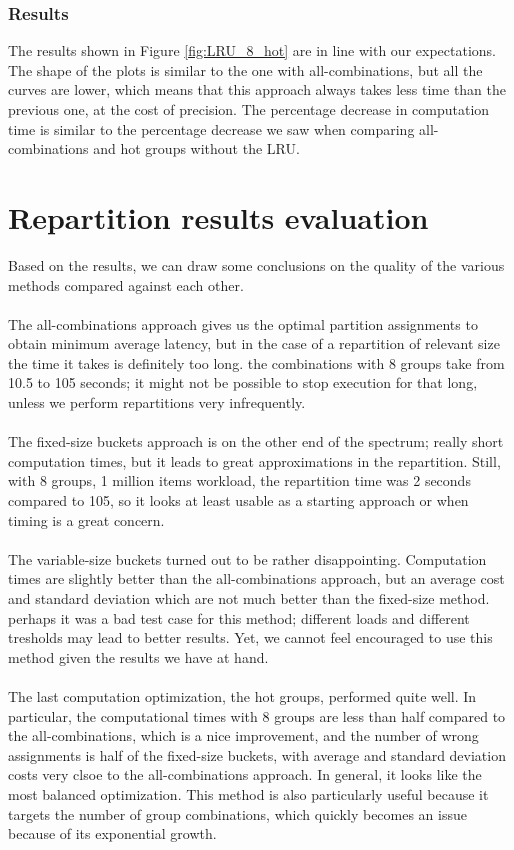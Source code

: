 \subsubsection{Results}
The results shown in Figure \ref{fig:LRU_8_hot} are in line with our expectations. The shape of the plots is similar to the one with all-combinations, but all the curves are lower, which means that this approach always takes less time than the previous one, at the cost of precision. The percentage decrease in computation time is similar to the percentage decrease we saw when comparing all-combinations and hot groups without the LRU. 

\section{Repartition results evaluation}\label{sec:repartition-results-evaluation}
Based on the results, we can draw some conclusions on the quality of the various methods compared against each other. 
\\\\
The all-combinations approach gives us the optimal partition assignments to obtain minimum average latency, but in the case of a repartition of relevant size the time it takes is definitely too long. the combinations with 8 groups take from 10.5 to 105 seconds; it might not be possible to stop execution for that long, unless we perform repartitions very infrequently.
\\\\
The fixed-size buckets approach is on the other end of the spectrum; really short computation times, but it leads to great approximations in the repartition. Still, with 8 groups, 1 million items workload, the repartition time was 2 seconds compared to 105, so it looks at least usable as a starting approach or when timing is a great concern.
\\\\
The variable-size buckets turned out to be rather disappointing. Computation times are slightly better than the all-combinations approach, but an average cost and standard deviation which are not much better than the fixed-size method. perhaps it was a bad test case for this method; different loads and different tresholds may lead to better results. Yet, we cannot feel encouraged to use this method given the results we have at hand.
\\\\
The last computation optimization, the hot groups, performed quite well. In particular, the computational times with 8 groups are less than half compared to the all-combinations, which is a nice improvement, and the number of wrong assignments is half of the fixed-size buckets, with average and standard deviation costs very clsoe to the all-combinations approach. In general, it looks like the most balanced optimization. This method is also particularly useful because it targets the number of group combinations, which quickly becomes an issue because of its exponential growth.
